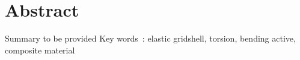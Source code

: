 
\cleardoublepage
\chapter*{Abstract}
Summary to be provided
\vskip0.5cm
Key words~: elastic gridshell, torsion, bending active, composite material



